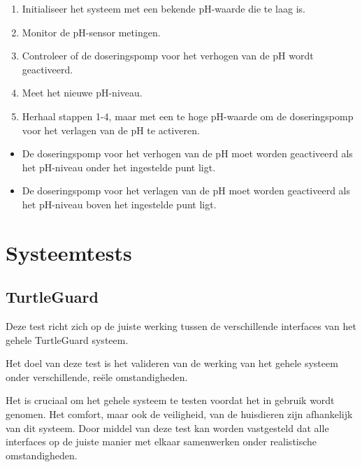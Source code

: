 \documentclass[a4paper]{report}
\newcommand{\turtleguard}{\mbox{TurtleGuard\texttrademark}\xspace}
\begin{document}
\begin{tcolorbox}[colback=white, colframe=black, title=Test Stappen]
  \begin{enumerate}
    \item Initialiseer het systeem met een bekende pH-waarde die te laag is.
    \item Monitor de pH-sensor metingen.
    \item Controleer of de doseringspomp voor het verhogen van de pH wordt geactiveerd.
    \item Meet het nieuwe pH-niveau.
    \item Herhaal stappen 1-4, maar met een te hoge pH-waarde om de doseringspomp voor het verlagen van de pH te activeren.
  \end{enumerate}
\end{tcolorbox}

\begin{tcolorbox}[colback=white, colframe=black, title=Slagingscriteria]
  \begin{itemize}
    \item De doseringspomp voor het verhogen van de pH moet worden geactiveerd als het pH-niveau onder het ingestelde punt ligt.
    \item De doseringspomp voor het verlagen van de pH moet worden geactiveerd als het pH-niveau boven het ingestelde punt ligt.
  \end{itemize}
\end{tcolorbox}


\section{Systeemtests}
\subsection{TurtleGuard}
\begin{tcolorbox}[colback=white, colframe=black, title=Beschrijving van de systeemtest]
  Deze test richt zich op de juiste werking tussen de verschillende interfaces van het gehele \turtleguard systeem.
\end{tcolorbox}

\begin{tcolorbox}[colback=white, colframe=black, title=Test Doel]
  Het doel van deze test is het valideren van de werking van het gehele systeem onder verschillende, reële omstandigheden.
\end{tcolorbox}

\begin{tcolorbox}[colback=white, colframe=black, title=Test Motivatie]
  Het is cruciaal om het gehele systeem te testen voordat het in gebruik wordt genomen. Het comfort, maar ook de veiligheid, van de huisdieren zijn afhankelijk van dit systeem.
  Door middel van deze test kan worden vastgesteld dat alle interfaces op de juiste manier met elkaar samenwerken onder realistische omstandigheden. 
\end{tcolorbox}
\end{document}

